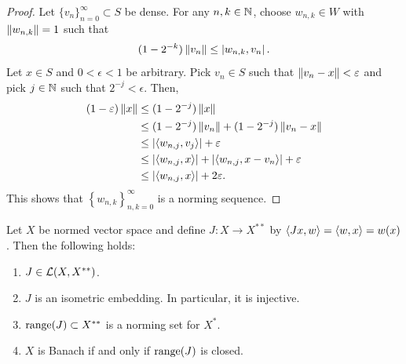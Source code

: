 \documentclass[a4paper]{article}
\renewcommand{\seqinfn}[1]{\{ #1 \}_{n=0}^\infty}
\begin{document}
\begin{proof}

  Let $\seqinfn{v_n} \subset S$ be dense. For any $n, k \in \mathbb{N}$, choose
  $w_{n, k} \in W$ with $\left\lVert w_{n, k}\right\rVert = 1$ such that
  \[
    (1 - 2^{-k}) \left\lVert v_n\right\rVert \leq \left\lvert w_{n, k}, v_n\right\rvert.
  \]
  Let $x \in S$ and $0 < \epsilon < 1$ be arbitrary. Pick $v_n \in S$ such
  that $\left\lVert v_n - x\right\rVert < \varepsilon$ and pick $j \in \mathbb{N}$ such that $2^{-j} <
  \epsilon$. Then,
  \[
    \begin{aligned}
      (1 - \varepsilon) \left\lVert x\right\rVert
       & \leq (1 - 2^{-j}) \left\lVert x\right\rVert                                    \\
       & \leq (1 - 2^{-j}) \left\lVert v_n\right\rVert + (1 - 2^{-j}) \left\lVert v_n - x\right\rVert    \\
       & \leq \left\lvert \left\langle w_{n, j}, v_j \right\rangle\right\rvert + \varepsilon                 \\
       & \leq \left\lvert \left\langle w_{n, j}, x \right\rangle\right\rvert + \left\lvert \left\langle w_{n, j},
                                              x - v_n \right\rangle\right\rvert + \varepsilon \\
       & \leq \left\lvert \left\langle w_{n, j}, x \right\rangle\right\rvert + 2 \varepsilon.
    \end{aligned}
  \]
  This shows that $\left\{ w_{n, k} \right\}_{n, k = 0}^\infty$ is a
  norming sequence.

\end{proof}

\begin{thm}
  Let $X$ be normed vector space and define $J: X \to X^{**}$ by
  $\left\langle Jx, w \right\rangle = \left\langle w, x \right\rangle = w(x)$. Then the following holds:
  \begin{enumerate}
    \item $J \in \mathcal{L}(X, X^{**})$.
    \item $J$ is an isometric embedding. In particular, it is
          injective.
    \item $\operatorname{range}(J) \subset X^{**}$ is a norming set for $X^*$.
    \item $X$ is Banach if and only if $\operatorname{range}(J)$ is closed.
  \end{enumerate}
\end{thm}
\end{document}
